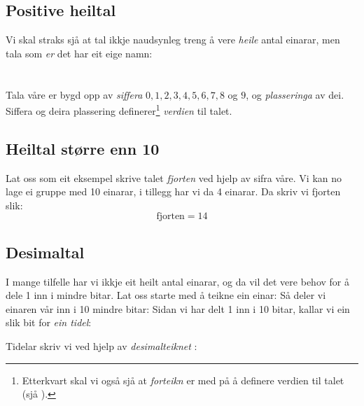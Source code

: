 \subsection*{Positive heiltal}
Vi skal straks sjå at tal ikkje naudsynleg treng å vere \textsl{heile} antal einarar, men tala som \textsl{er} det har eit eige namn:\regv


\newpage
\section{\talsifverd}
Tala våre er bygd opp av \textit{siffera} $ 0, 1, 2 , 3, 4, 5, 6, 7, 8 $ og $ 9 $, og \textsl{plasseringa} av dei. Siffera og deira plassering definerer\footnote{Etterkvart skal vi også sjå at \textit{forteikn} er med på å definere verdien til talet (sjå ).} \textit{verdien}  til talet.
\subsection*{Heiltal større enn 10}
Lat oss som eit eksempel skrive talet \textsl{fjorten} ved hjelp av sifra våre.
Vi kan no lage ei gruppe med 10 einarar, i tillegg har vi da 4 einarar. Da skriv vi fjorten slik:
\[ \text{fjorten}=14 \]
\vsk

\newpage
\subsection*{Desimaltal}
I mange tilfelle har vi ikkje eit heilt antal einarar, og da vil det vere behov for å dele 1 inn i mindre bitar. Lat oss starte med å teikne ein einar:
Så deler vi einaren vår inn i 10 mindre bitar:
Sidan vi har delt 1 inn i 10 bitar, kallar vi ein slik bit for \textit{ein tidel}:
\begin{comment}
\eks{\vs
	\fig{maal2}
	\fig{des2}
}\vsk
\end{comment}
Tidelar skriv vi ved hjelp av  \textit{desimalteiknet} \sym{,}  :
\regv
{}
\newpage
